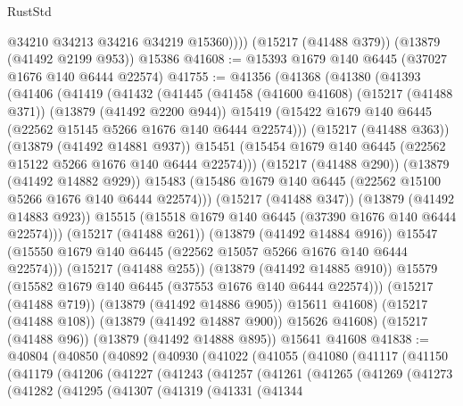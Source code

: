 \begin{lexlean}{RustStd}
\begin{coremodule}
            @34210
            @34213
            @34216
            @34219
            @15360))))
    (@15217 (@41488 @379))
    (@13879 (@41492 @2199 @953))
    @15386
@41608 := @15393 @1679 @140 @6445 (@37027 @1676 @140 @6444 @22574)
@41755 := @41356
    (@41368
      (@41380
        (@41393
          (@41406
            (@41419
              (@41432
                (@41445
                  (@41458
                    (@41600 @41608)
                    (@15217 (@41488 @371))
                    (@13879 (@41492 @2200 @944))
                    @15419
                    (@15422 @1679 @140 @6445 (@22562 @15145 @5266 @1676 @140 @6444 @22574)))
                  (@15217 (@41488 @363))
                  (@13879 (@41492 @14881 @937))
                  @15451
                  (@15454 @1679 @140 @6445 (@22562 @15122 @5266 @1676 @140 @6444 @22574)))
                (@15217 (@41488 @290))
                (@13879 (@41492 @14882 @929))
                @15483
                (@15486 @1679 @140 @6445 (@22562 @15100 @5266 @1676 @140 @6444 @22574)))
              (@15217 (@41488 @347))
              (@13879 (@41492 @14883 @923))
              @15515
              (@15518 @1679 @140 @6445 (@37390 @1676 @140 @6444 @22574)))
            (@15217 (@41488 @261))
            (@13879 (@41492 @14884 @916))
            @15547
            (@15550 @1679 @140 @6445 (@22562 @15057 @5266 @1676 @140 @6444 @22574)))
          (@15217 (@41488 @255))
          (@13879 (@41492 @14885 @910))
          @15579
          (@15582 @1679 @140 @6445 (@37553 @1676 @140 @6444 @22574)))
        (@15217 (@41488 @719))
        (@13879 (@41492 @14886 @905))
        @15611
        @41608)
      (@15217 (@41488 @108))
      (@13879 (@41492 @14887 @900))
      @15626
      @41608)
    (@15217 (@41488 @96))
    (@13879 (@41492 @14888 @895))
    @15641
    @41608
@41838 := @40804
    (@40850
      (@40892
        (@40930
          (@41022
            (@41055
              (@41080
                (@41117
                  (@41150
                    (@41179
                      (@41206
                        (@41227
                          (@41243
                            (@41257
                              (@41261
                                (@41265
                                  (@41269
                                    (@41273
                                      (@41282
                                        (@41295
                                          (@41307
                                            (@41319
                                              (@41331
                                                (@41344

\end{coremodule}
\end{lexlean}

